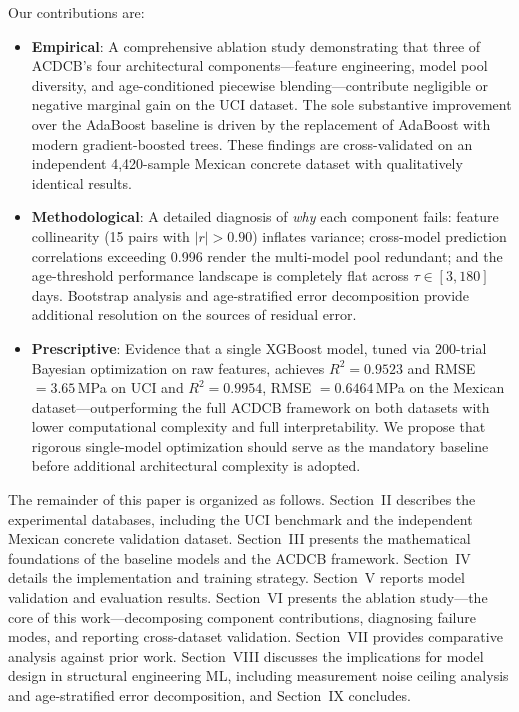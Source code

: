 \documentclass[journal]{IEEEtran}
\begin{document}
Our contributions are:

\begin{itemize}
\item \textbf{Empirical}: A comprehensive ablation study demonstrating that three of ACDCB's four architectural components---feature engineering, model pool diversity, and age-conditioned piecewise blending---contribute negligible or negative marginal gain on the UCI dataset. The sole substantive improvement over the AdaBoost baseline is driven by the replacement of AdaBoost with modern gradient-boosted trees. These findings are cross-validated on an independent 4{,}420-sample Mexican concrete dataset with qualitatively identical results.

\item \textbf{Methodological}: A detailed diagnosis of \emph{why} each component fails: feature collinearity (15 pairs with $|r| > 0.90$) inflates variance; cross-model prediction correlations exceeding 0.996 render the multi-model pool redundant; and the age-threshold performance landscape is completely flat across $\tau \in [3, 180]$ days. Bootstrap analysis and age-stratified error decomposition provide additional resolution on the sources of residual error.

\item \textbf{Prescriptive}: Evidence that a single XGBoost model, tuned via 200-trial Bayesian optimization on raw features, achieves $R^2 = 0.9523$ and RMSE $= 3.65$\,MPa on UCI and $R^2 = 0.9954$, RMSE $= 0.6464$\,MPa on the Mexican dataset---outperforming the full ACDCB framework on both datasets with lower computational complexity and full interpretability. We propose that rigorous single-model optimization should serve as the mandatory baseline before additional architectural complexity is adopted.
\end{itemize}

The remainder of this paper is organized as follows. Section~II describes the experimental databases, including the UCI benchmark and the independent Mexican concrete validation dataset. Section~III presents the mathematical foundations of the baseline models and the ACDCB framework. Section~IV details the implementation and training strategy. Section~V reports model validation and evaluation results. Section~VI presents the ablation study---the core of this work---decomposing component contributions, diagnosing failure modes, and reporting cross-dataset validation. Section~VII provides comparative analysis against prior work. Section~VIII discusses the implications for model design in structural engineering ML, including measurement noise ceiling analysis and age-stratified error decomposition, and Section~IX concludes.
\end{document}
